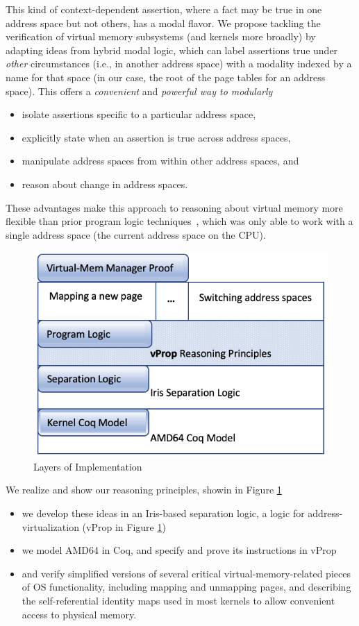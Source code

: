 This kind of context-dependent assertion, where a fact may be true in one address space but not others, has a modal flavor. 
We propose tackling the verification of virtual memory subsystems (and kernels more broadly) by adapting ideas from hybrid modal logic, which can label assertions true under \emph{other} circumstances (i.e., in another address space) with a modality indexed by a name for that space (in our case, the root of the page tables for an address space). This offers a \textit{convenient} and \textit{powerful way to modularly}
\begin{itemize}
\item isolate assertions specific to a particular address space,
\item explicitly state when an assertion is true across address spaces,
\item manipulate address spaces from within other address spaces, and
\item reason about change in address spaces.
\end{itemize}
  These advantages make this approach to reasoning about virtual memory more flexible than prior program logic techniques~\cite{kolanski08vstte,kolanski09tphols}, which was only able to work with a single address space (the current address space on the CPU).

\begin{figure}
   \includegraphics[width=0.5\columnwidth]{architecture.png}
  \caption{Layers of Implementation}
  \label{fig:architecture}
\end{figure}
We realize and show our reasoning principles, showin in Figure \ref{fig:architecture}
\begin{itemize}
\item we develop these ideas in an Iris-based separation logic, a logic for address-virtualization (\textsf{vProp} in Figure \ref{fig:architecture})
\item we model \textsf{AMD64} in Coq, and specify and prove its instructions in \textsf{vProp}
\item and verify simplified versions of several critical virtual-memory-related pieces of OS functionality, including mapping and unmapping pages, and describing the self-referential identity maps used in most kernels to allow convenient access to physical memory.
\end{itemize}

